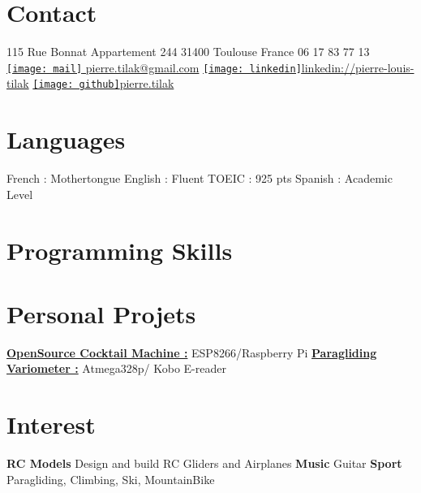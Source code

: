 \documentclass[a4paper]{friggeri-cv} %
\begin{document}


\begin{aside} %
\section{Contact}
115 Rue Bonnat
Appartement 244
31400 Toulouse
France
06 17 83 77 13
~
\href{mailto:pierre.tilak@gmail.com}{\texttt{[image: mail]} pierre.tilak@gmail.com}
\href{https://www.linkedin.com/pub/pierre-louis-tilak/96/162/a83}{\texttt{[image: linkedin]}linkedin://pierre-louis-tilak}
\href{https://github.com/tilaktilak}{\texttt{[image: github]}pierre.tilak}
\section{Languages}
French : Mothertongue
English : Fluent
TOEIC : 925 pts 
Spanish : Academic Level\bigskip\bigskip
\section{Programming Skills}
\bigskip\bigskip
\section{Personal Projets}
\href{https://github.com/tilaktilak/Inebriator}{\textbf{OpenSource Cocktail Machine :}}
ESP8266/Raspberry Pi\bigskip
\href{https://github.com/tilaktilak/xcvario}{\textbf{Paragliding Variometer :}}
Atmega328p/ Kobo E-reader\bigskip\bigskip
\section{Interest}
\textbf{RC Models} Design and build RC Gliders and Airplanes
\textbf{Music} Guitar
\textbf{Sport} Paragliding, Climbing, Ski, MountainBike
\end{aside}
\end{document}

